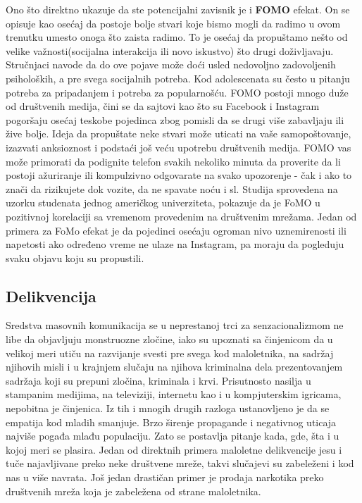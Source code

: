 \documentclass[a4paper]{article}
\begin{document}
{		Ono što direktno ukazuje da ste potencijalni zavisnik je i \textbf{FOMO} efekat. On se opisuje kao osećaj da postoje bolje stvari koje bismo mogli da radimo u ovom trenutku umesto onoga što zaista radimo. To je osećaj da propuštamo nešto od velike važnosti(socijalna interakcija ili novo iskustvo) što drugi doživljavaju. Stručnjaci navode da do ove pojave može doći usled nedovoljno zadovoljenih psiholoških, a pre svega socijalnih potreba. Kod adolescenata su često u pitanju potreba za pripadanjem i potreba za popularnošću. FOMO postoji mnogo duže od društvenih medija, čini se da sajtovi kao što su Facebook i Instagram pogoršaju osećaj teskobe pojedinca zbog pomisli da se drugi više zabavljaju ili žive bolje. Ideja da propuštate neke stvari može uticati na vaše samopoštovanje, izazvati anksioznost i podstaći još veću upotrebu društvenih medija. FOMO vas može primorati da podignite telefon svakih nekoliko minuta da proverite da li postoji ažuriranje ili kompulzivno odgovarate na svako upozorenje - čak i ako to znači da rizikujete dok vozite, da ne spavate noću i sl. Studija sprovedena na uzorku studenata jednog američkog univerziteta, pokazuje da je FoMO u pozitivnoj korelaciji sa vremenom provedenim na društvenim mrežama. Jedan od primera za FoMo efekat je da pojedinci osećaju ogroman nivo uznemirenosti  ili napetosti ako određeno vreme ne ulaze na Instagram, pa moraju da pogleduju svaku objavu koju su propustili.
		
		\subsection{Delikvencija}
		
		Sredstva masovnih komunikacija se u neprestanoj trci za senzacionalizmom ne
		libe da objavljuju monstruozne zločine, iako su upoznati sa činjenicom da u velikoj meri utiču na razvijanje svesti pre svega kod maloletnika, na sadržaj njihovih misli i u krajnjem slučaju na njihova kriminalna dela prezentovanjem sadržaja koji su prepuni zločina, kriminala i krvi. Prisutnosto nasilja u stampanim medijima, na televiziji, internetu kao i u kompjuterskim igricama, nepobitna je činjenica. Iz tih i mnogih drugih razloga ustanovljeno je da se empatija kod mladih smanjuje. Brzo širenje propagande i negativnog uticaja najviše pogađa mlađu populaciju. Zato se postavlja pitanje kada, gde, šta i u kojoj meri se plasira. Jedan od direktnih primera maloletne delikvencije jesu i tuče najavljivane preko neke društvene mreže, takvi slučajevi su zabeleženi i kod nas u više navrata. Još jedan drastičan primer je prodaja narkotika preko društvenih mreža koja je zabeležena od strane maloletnika.
		
}
\end{document}
